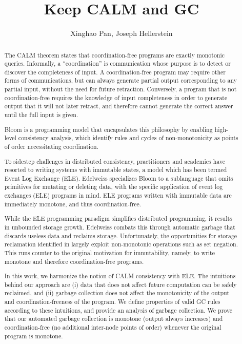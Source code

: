 \documentclass{article}
\title{Keep CALM and GC}
\author{Xinghao Pan, Joseph Hellerstein}
\numberwithin{equation}{section}
\begin{document}
\maketitle

\begin{abstract}
The CALM theorem \cite{hellerstein2010declarative, ameloot2013relational} states that coordination-free programs are exactly monotonic queries.
Informally, a ``coordination'' is communication whose purpose is to detect or discover the completeness of input.
A coordination-free program may require other forms of communications, but can always generate partial output corresponding to any partial input, without the need for future retraction.
Conversely, a program that is not coordination-free requires the knowledge of input completeness in order to generate output that it will not later retract, and therefore cannot generate the correct answer until the full input is given.

Bloom \cite{alvaro2011consistency} is a programming model that encapsulates this philosophy by enabling high-level consistency analysis, which identify rules and cycles of non-monotonicity as points of order necessitating coordination.

To sidestep challenges in distributed consistency, practitioners and academics have resorted to writing systems with immutable states, a model which has been termed Event Log Exchange (ELE).
Edelweiss \cite{conway2014edelweiss} specializes Bloom to a sublanguage that omits primitives for mutating or deleting data, with the specific application of event log exchanges (ELE) programs in mind.
ELE programs written with immutable data are immediately monotone, and thus coordination-free.

While the ELE programming paradigm simplifies distributed programming, it results in unbounded storage growth.
Edelweiss combats this through automatic garbage that discards useless data and reclaims storage.
Unfortunately, the opportunities for storage reclamation identified in \cite{conway2014edelweiss} largely exploit non-monotonic operations such as set negation.
This runs counter to the original motivation for immutability, namely, to write monotone and therefore coordination-free programs.

In this work, we harmonize the notion of CALM consistency with ELE.
The intuitions behind our approach are (i) data that does not affect future computation can be safely reclaimed, and (ii) garbage collection does not affect the monotonicity of the output and coordination-freeness of the program.
We define properties of valid GC rules according to these intuitions, and provide an analysis of garbage collection.
We prove that our automated garbage collection is monotone (output always increases) and coordination-free (no additional inter-node points of order) whenever the original program is monotone.
\end{abstract}
\end{document}
